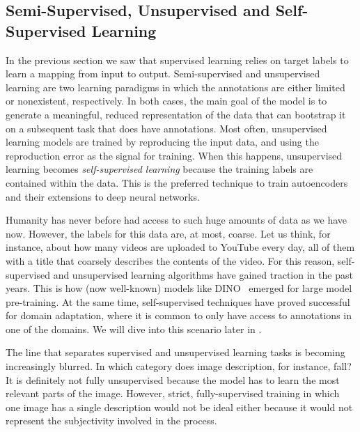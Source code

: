 \subsection{Semi-Supervised, Unsupervised and Self-Supervised Learning}\label{subsec:semi_self}
In the previous section we saw that supervised learning relies on target labels to learn a mapping from input to output. Semi-supervised and unsupervised learning are two learning paradigms in which the annotations are either limited or nonexistent, respectively. In both cases, the main goal of the model is to generate a meaningful, reduced representation of the data that can bootstrap it on a subsequent task that does have annotations. Most often, unsupervised learning models are trained by reproducing the input data, and using the reproduction error as the signal for training. When this happens, unsupervised learning becomes \textit{self-supervised learning} because the training labels are contained within the data. This is the preferred technique to train autoencoders and their extensions to deep neural networks. 

Humanity has never before had access to such huge amounts of data as we have now. However, the labels for this data are, at most, coarse. Let us think, for instance, about how many videos are uploaded to YouTube every day, all of them with a title that coarsely describes the contents of the video. For this reason, self-supervised and unsupervised learning algorithms have gained traction in the past years. This is how (now well-known) models like DINO~ emerged for large model pre-training. At the same time, self-supervised techniques have proved successful for domain adaptation, where it is common to only have access to annotations in one of the domains. We will dive into this scenario later in .

The line that separates supervised and unsupervised learning tasks is becoming increasingly blurred. In which category does image description, for instance, fall? It is definitely not fully unsupervised because the model has to learn the most relevant parts of the image. However, strict, fully-supervised training in which one image has a single description would not be ideal either because it would not represent the subjectivity involved in the process.

